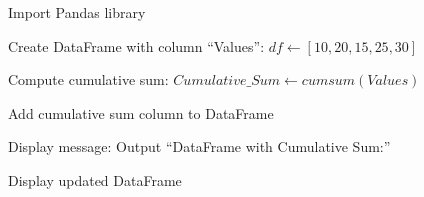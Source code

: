 \begin{algorithm}
\caption{Create a Cumulative Sum Column in a Pandas DataFrame}
\begin{algorithmic}[1]

\STATE Import Pandas library

\STATE Create DataFrame with column ``Values'':
\STATE $df \gets [10, 20, 15, 25, 30]$

\STATE Compute cumulative sum:
\STATE $Cumulative\_Sum \gets cumsum(Values)$

\STATE Add cumulative sum column to DataFrame

\STATE Display message:
\STATE Output ``DataFrame with Cumulative Sum:''

\STATE Display updated DataFrame

\end{algorithmic}
\end{algorithm}